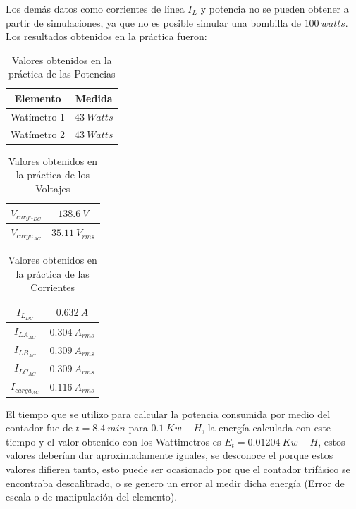 \documentclass[twocolumn]{IEEEtran}
\begin{document}
\noindent
Los demás datos como corrientes de línea  $I_L$ y potencia no se pueden obtener a partir de simulaciones, ya que no es posible simular una bombilla de $100\ watts$.\\
Los resultados obtenidos en la práctica fueron:
\begin{table}[H]
	\centering
\begin{tabular}[c]{|c|c|} \hline
Elemento & Medida \\ \hline
Watímetro 1 & $43\ Watts$ \\ \hline
Watímetro 2 & $43\ Watts$ \\ \hline
\end{tabular}
	\caption{Valores obtenidos en la práctica de las Potencias}
	\label{tab7}
\end{table}
\begin{table}[H]
	\centering
\begin{tabular}[c]{|c|c|} \hline
$V_{carga_{DC}}$ & $138.6\ V$ \\ \hline
$V_{carga_{AC}}$ & $35.11\ V_{rms}$ \\ \hline
\end{tabular}
	\caption{Valores obtenidos en la práctica de los Voltajes}
	\label{tab8}
\end{table}
\begin{table}[H]
	\centering
\begin{tabular}[c]{|c|c|} \hline
$I_{L_{DC}}$ & $0.632\ A$ \\ \hline
$I_{{LA}_{AC}}$ & $0.304\ A_{rms}$ \\ \hline
$I_{{LB}_{AC}}$ & $0.309\ A_{rms}$ \\ \hline
$I_{{LC}_{AC}}$ & $0.309\ A_{rms}$ \\ \hline
$I_{carga_{AC}}$ & $0.116\ A_{rms}$ \\ \hline
\end{tabular}
	\caption{Valores obtenidos en la práctica de las Corrientes}
	\label{tab9}
\end{table}
\noindent
El tiempo que se utilizo para calcular la potencia consumida por medio del contador fue de $t=8.4\ min$ para $0.1\ Kw-H$, la energía calculada con este tiempo y el valor obtenido con los Wattimetros es $E_t = 0.01204\ Kw-H$, estos valores deberían dar aproximadamente iguales, se desconoce el porque estos valores difieren tanto, esto puede ser ocasionado por que el contador trifásico se encontraba descalibrado, o se genero un error al medir dicha energía (Error de escala o de manipulación del elemento).
\end{document}
